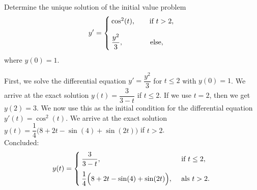 




\begin{Exercise} Determine the unique solution of the initial value problem
\begin{equation*}
y'=\left\{\setlength{\arraycolsep}{2pt} \begin{array}{lcl} 
\cos^2 (t), & & \quad \text{ if }  t>2,\\[0.4cm]
\dfrac{y^2}{3}, & & \hspace{0.5cm} \text{else}, 
\end{array}\right.
\end{equation*}
where $y(0)=1$.
\end{Exercise}

\begin{Answer} First, we solve the differential equation $y' = \dfrac{y^2}{3}$ for $t \leq 2$ with $y(0) = 1$. We arrive at the exact solution $y(t) = \dfrac{3}{3-t}$ if $t \leq 2$. If we use $t = 2$, then we get $y(2) = 3$. We now use this as the initial condition for the differential equation $y'(t) = \cos^2(t)$. We arrive at the exact solution $y(t) = \dfrac{1}{4}\Big( 8 + 2t - \sin(4) + \sin(2t) \Big)$ if $t > 2$.\\

Concluded:
\begin{equation*}
y(t)=\left\{\setlength{\arraycolsep}{2pt} \begin{array}{ll} 
\dfrac{3}{3-t}, & \quad\text{if }t \leq 2,\\[0.4cm]
\dfrac{1}{4}\Big( 8 + 2t - \sin(4) + \sin(2t) \Big), & \quad\text{als }t > 2.
\end{array}\right.
\end{equation*}
\end{Answer}

